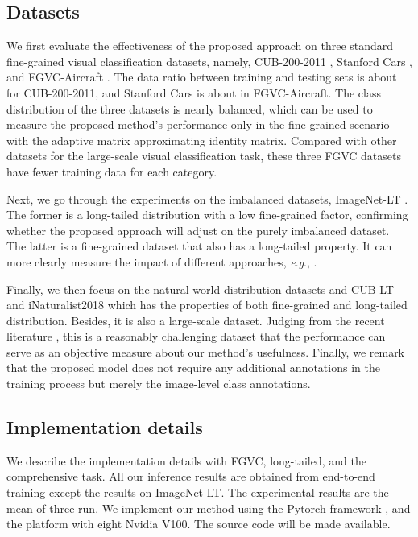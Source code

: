 \documentclass{article}
\newcommand{\eg}{\textit{e}.\textit{g}.}
\begin{document}
\subsection{Datasets}


We first evaluate the effectiveness of the proposed approach on three standard fine-grained visual classification datasets, namely, CUB-200-2011 \cite{WahCUB_200_2011}, Stanford Cars \cite{KrauseStarkDengFei-Fei_3DRR2013}, and FGVC-Aircraft \cite{maji13fine-grained}. 
The data ratio between training and testing sets is about  for CUB-200-2011, and Stanford Cars is about  in FGVC-Aircraft. The class distribution of the three datasets is nearly balanced, which can be used to measure the proposed method's performance only in the fine-grained scenario with the adaptive matrix  approximating identity matrix. Compared with other datasets for the large-scale visual classification task, these three FGVC datasets have fewer training data for each category.

Next, we go through the experiments on the imbalanced datasets, ImageNet-LT \cite{DBLP:journals/corr/abs-1904-05160}. The former is a long-tailed distribution with a low fine-grained factor, confirming whether the proposed approach will adjust on the purely imbalanced dataset. The latter is a fine-grained dataset that also has a long-tailed property. It can more clearly measure the impact of different approaches, \eg, \cite{Kang2020Decoupling,dubey2018pairwise,du2020fine}.

Finally, we then focus on the natural world distribution datasets and CUB-LT \cite{samuel2021generalized} and iNaturalist2018 \cite{van2018inaturalist} 
which has the properties of both fine-grained and long-tailed distribution. Besides, it is also a large-scale dataset. Judging from the recent literature \cite{cao2019learning,Kang2020Decoupling}, this is a reasonably challenging dataset that the performance can serve as an objective measure about our method's usefulness. Finally, we remark that the proposed model does not require any additional annotations in the training process but merely the image-level class annotations.


\subsection{Implementation details}
\label{subsec:details}


We describe the implementation details with FGVC, long-tailed, and the comprehensive task. All our inference results are obtained from end-to-end training except the results on ImageNet-LT. The experimental results are the mean of three run. We implement our method using the Pytorch framework \cite{paszke2017automatic}, and the platform with eight Nvidia V100. The source code will be made available. 
\vspace{-10pt}
\end{document}
